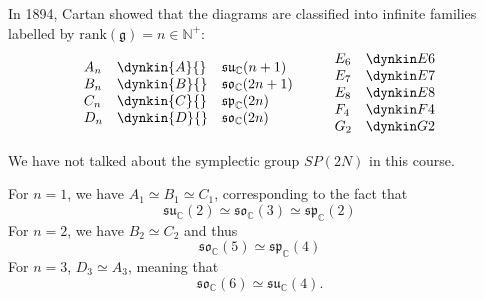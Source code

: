 In 1894, Cartan showed that the diagrams are classified into infinite families labelled by $\text{rank}(\mathfrak{g}) = n \in \mathbb{N}^+$:
\[ \begin{array}{lll}
    A_n & \dynkin{A}{} & \mathfrak{su}_{\mathbb{C}}(n+1) \\
    B_n & \dynkin{B}{} & \mathfrak{so}_{\mathbb{C}}(2n+1) \\
    C_n & \dynkin{C}{} & \mathfrak{sp}_{\mathbb{C}}(2n) \\
    D_n & \dynkin{D}{} & \mathfrak{so}_{\mathbb{C}}(2n) \\
  \end{array} \qquad
  \begin{array}{ll}
    \Dynk{E}{6} \\
    \Dynk{E}{7} \\
    \Dynk{E}{8} \\
    \Dynk{F}{4} \\
    \Dynk{G}{2} \\
  \end{array} \]
\begin{leftbar}
  \begin{note}
    We have not talked about the symplectic group $SP(2N)$ in this course.
  \end{note}
\end{leftbar}
For $n = 1$, we have $A_1 \simeq B_1 \simeq C_1$, corresponding to the fact that
\begin{equation}
  \mathfrak{su}_{\mathbb{C}}(2) \simeq \mathfrak{so}_{\mathbb{C}}(3) \simeq \mathfrak{sp}_{\mathbb{C}}(2)
\end{equation}
For $n = 2$, we have $B_2 \simeq C_2$  and thus
\begin{equation}
  \mathfrak{so}_{\mathbb{C}}(5) \simeq \mathfrak{sp}_{\mathbb{C}}(4)
\end{equation}
For $n = 3$, $D_3 \simeq A_3$, meaning that
\begin{equation}
  \mathfrak{so}_{\mathbb{C}}(6) \simeq \mathfrak{su}_{\mathbb{C}}(4).
\end{equation}
